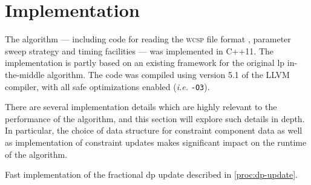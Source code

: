 \section{Implementation}
The algorithm --- including code for reading the \textsc{wcsp} file format \parencite{wcspformat}, parameter sweep strategy and timing facilities --- was implemented in C++11.
The implementation is partly based on an existing framework for the original \gls{lp} in-the-middle algorithm.
The code was compiled using version 5.1 of the LLVM compiler, with all safe optimizations enabled (\emph{i.e.} \texttt{-O3}).

There are several implementation details which are highly relevant to the performance of the algorithm, and this section will explore such details in depth.
In particular, the choice of data structure for constraint component data as well as implementation of constraint updates makes significant impact on the runtime of the algorithm.

\begin{algorithm}[p]

	\caption{
		Fast implementation of the fractional \gls{dp} update described in \cref{proc:dp-update}.
	}
	\label{proc:frac-dp-update-fast}
\end{algorithm}

